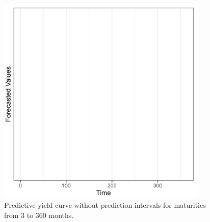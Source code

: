 \begin{figure}[H]
    \centering
    \includegraphics[width=0.9\textwidth]{../figures/forecast_no_intervals.png}
    \caption{Predictive yield curve without prediction intervals for maturities from 3 to 360 months.}
\end{figure}